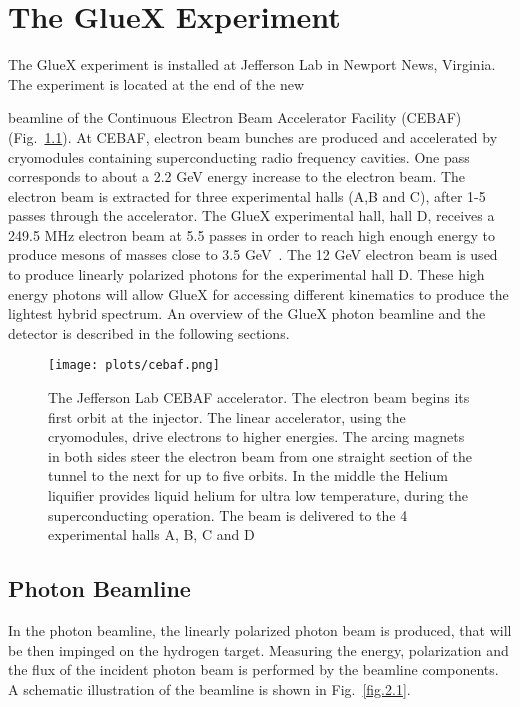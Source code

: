 \chapter{The GlueX Experiment}
\label{p.2}

The GlueX experiment is installed at Jefferson Lab in Newport News, Virginia. The experiment is located at the end of the new {beamline of the Continuous Electron Beam Accelerator Facility (CEBAF) (Fig.~\ref{fig.2}). At CEBAF, electron beam bunches are produced and accelerated by cryomodules containing superconducting radio frequency cavities. One pass corresponds to about a 2.2 GeV energy increase to the electron beam. The electron beam is extracted for three experimental halls (A,B and C), after 1-5 passes through the accelerator. The GlueX experimental hall, hall D, receives a 249.5 MHz electron beam at 5.5 passes in order to reach high enough energy to produce mesons of masses close to 3.5 GeV~\cite{Charles16}. The 12 GeV electron beam is used to produce linearly polarized photons for the experimental hall D. These high energy photons will allow GlueX for accessing different kinematics to produce the lightest hybrid spectrum. An overview of the GlueX photon beamline and the detector is described in the following sections.

\begin{center}
\null
\vfill
\begin{figure}[H]
    \centering
        \texttt{[image: plots/cebaf.png]}
        \caption{The Jefferson Lab CEBAF accelerator. The electron beam begins its first orbit at the injector. The linear accelerator, using the cryomodules, drive electrons to higher energies. The arcing magnets in both sides steer the electron beam from one straight section of the tunnel to the next for up to five orbits. In the middle the Helium liquifier provides liquid helium for ultra low temperature, during the superconducting operation. The beam is delivered to the 4 experimental halls A, B, C and D~\cite{Charles16}}
        \label{fig.2}
\end{figure}
\null
\vfill
\end{center}

\section{Photon Beamline}
\label{p.2.1}

In the photon beamline, the linearly polarized photon beam is produced, that will be then impinged on the hydrogen target. Measuring the energy, polarization and the flux of the incident photon beam is performed by the beamline components. A schematic illustration of the beamline is shown in Fig.~\ref{fig.2.1}.

}
